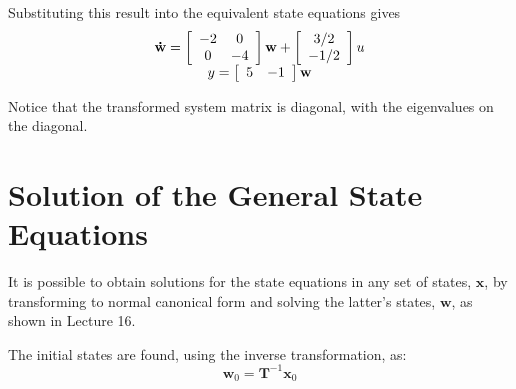 Substituting this result into the equivalent state equations gives
\[
\begin{array}{c}
 {\bf{\dot w}} = \left[ {\begin{array}{*{20}c}
   { - 2} & 0  \\
   0 & { - 4}  \\
\end{array}} \right]{\bf{w}} + \left[ {\begin{array}{*{20}c}
   {{3 \mathord{\left/
 {\vphantom {3 2}} \right.
 \kern-\nulldelimiterspace} 2}}  \\
   { - {1 \mathord{\left/
 {\vphantom {1 2}} \right.
 \kern-\nulldelimiterspace} 2}}  \\
\end{array}} \right]u \\ 
 y = \left[ {\begin{array}{*{20}c}
   5 & { - 1}  \\
\end{array}} \right]{\bf{w}} \\ 
 \end{array}
\]


Notice that the transformed system matrix is diagonal, with the eigenvalues on the diagonal.

\section*{Solution of the General State Equations}

It is possible to obtain solutions for the state equations in any set of states, $\mathbf{x}$, by transforming to normal canonical form and solving the latter's states, $\mathbf{w}$, as shown in Lecture 16. 

The initial states are found, using the inverse transformation, as:
\[
\mathbf{w}_0=\mathbf{T}^{-1}\mathbf{x}_0
\]

